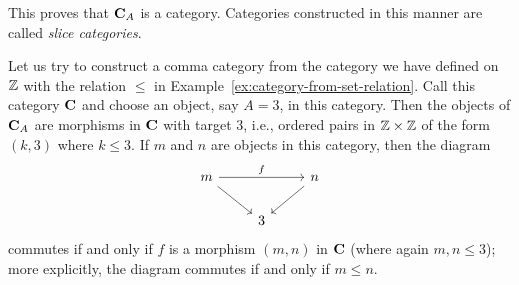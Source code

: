 \begin{example}
    This proves that \(\mathbf{C}_A\) is a category. Categories constructed in
    this manner are called \emph{slice categories}.

    Let us try to construct a comma category from the category we have defined
    on \(\mathbb{Z}\) with the relation \(\leq\) in
    Example~\ref{ex:category-from-set-relation}. Call this category \(\mathbf{C}\)
    and choose an object, say \(A = 3\), in this category. Then the objects of
    \(\mathbf{C}_A\) are morphisms in \(\mathbf{C}\) with target \(3\), i.e.,
    ordered pairs in \(\mathbb{Z} \times \mathbb{Z}\) of the form \((k, 3)\) where \(k \leq 3\).
    If \(m\) and \(n\) are objects in this category, then the diagram
    \[
        \begin{tikzcd}
            m \arrow[rd] \arrow[rr, "f"] &   & n \arrow[ld] \\
                                         & 3 &             
            \end{tikzcd}
    \]
    commutes if and only if \(f\) is a morphism \((m, n)\) in \(\mathbf{C}\)
    (where again \(m, n \leq 3\)); more explicitly, the diagram commutes if and
    only if \(m \leq n\).
\end{example}

